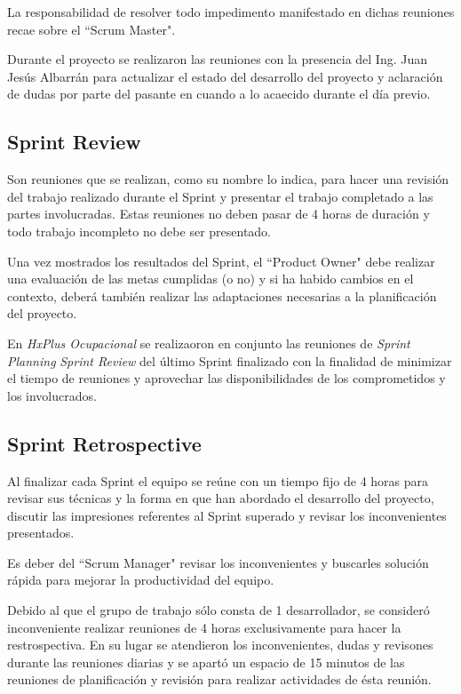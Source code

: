         La responsabilidad de resolver todo impedimento manifestado en dichas reuniones recae sobre el ``Scrum Master".
        
        Durante el proyecto se realizaron las reuniones con la presencia del Ing. Juan Jesús Albarrán para actualizar el estado del desarrollo del proyecto y aclaración de dudas por parte del pasante en cuando a lo acaecido durante el día previo.
        
        \subsection{Sprint Review}
        
        Son reuniones que se realizan, como su nombre lo indica, para hacer una revisión del trabajo realizado durante el Sprint y presentar el trabajo completado a las partes involucradas. Estas reuniones no deben pasar de 4 horas de duración y todo trabajo incompleto no debe ser presentado.
        
        Una vez mostrados los resultados del Sprint, el ``Product Owner" debe realizar una evaluación de las metas cumplidas (o no) y si ha habido cambios en el contexto, deberá también realizar las adaptaciones necesarias a la planificación del proyecto.
        
        En \textit{HxPlus Ocupacional} se realizaoron en conjunto las reuniones de \textit{Sprint Planning} \textit{Sprint Review} del último Sprint finalizado con la finalidad de minimizar el tiempo de reuniones y aprovechar las disponibilidades de los comprometidos y los involucrados.
        
        \subsection{Sprint Retrospective}
        
        Al finalizar cada Sprint el equipo se reúne con un tiempo fijo de 4 horas para revisar sus técnicas y la forma en que han abordado el desarrollo del proyecto, discutir las impresiones referentes al Sprint superado y revisar los inconvenientes presentados.
        
        Es deber del ``Scrum Manager" revisar los inconvenientes y buscarles solución rápida para mejorar la productividad del equipo.
        
        Debido al que el grupo de trabajo sólo consta de 1 desarrollador, se consideró inconveniente realizar reuniones de 4 horas exclusivamente para hacer la restrospectiva. En su lugar se atendieron los inconvenientes, dudas y revisones durante las reuniones diarias y se apartó un espacio de 15 minutos de las reuniones de planificación y revisión para realizar actividades de ésta reunión.
        
